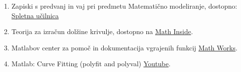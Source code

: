\documentclass{article}
\begin{document}
    	\begin{enumerate}[label=\textbullet]
    		\item Zapiski s predvanj in vaj pri predmetu Matematično modeliranje, dostopno: \href{https://ucilnica.fmf.uni-lj.si/course/view.php?id=135}{Spletna učilnica}
    		\item Teorija za izračun dolžine krivulje, dostopno na \href{https://mathinsight.org/length\_curves\_refresher}{Math Inside}.
    		\item Matlabov center za pomoč in dokumentacija vgrajenih funkcij \href{https://ch.mathworks.com/help/matlab/ref/polyfit.html}{Math Works}.
    		\item Matlab: Curve Fitting (polyfit and polyval) \href{https://www.youtube.com/watch?v=GOwPA1LPDaQ&t=374s}{Youtube}.
    	\end{enumerate}
 
\end{document}
